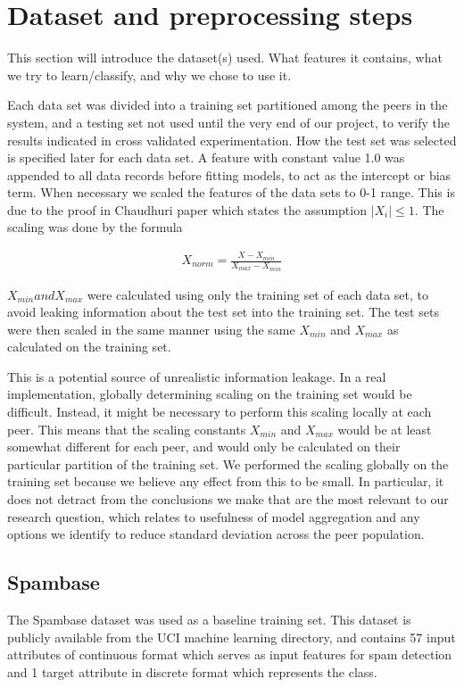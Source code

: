 \section{Dataset and preprocessing steps}
\label{sec:datasets}
This section will introduce the dataset(s) used. What features it contains, what we try to learn/classify, and why we chose to use it.

Each data set was divided into a training set partitioned among the peers in the system, and a testing set not used until the very end of our project, to verify the results indicated in cross validated experimentation. How the test set was selected is specified later for each data set.
A feature with constant value 1.0 was appended to all data records before fitting models, to act as the intercept or bias term. When necessary we scaled the features of the data sets to 0-1 range. This is due to the proof in Chaudhuri paper which states the assumption $|X_i|\leq 1$. The scaling was done by the formula

\begin{eqnarray}
X_{norm} = \frac{X-X_{min}}{X_{max} - X_{min}}
\end{eqnarray}

$X_{min} and X_{max}$ were calculated using only the training set of each data set, to avoid leaking information about the test set into the training set. The test sets were then scaled in the same manner using the same $X_{min}$ and $X_{max}$ as calculated on the training set.

This is a potential source of unrealistic information leakage. In a real implementation, globally determining scaling on the training set would be difficult. Instead, it might be necessary to perform this scaling locally at each peer. This means that the scaling constants $X_{min}$ and $X_{max}$ would be at least somewhat different for each peer, and would only be calculated on their particular partition of the training set. We performed the scaling globally on the training set because we believe any effect from this to be small. In particular, it does not detract from the conclusions we make that are the most relevant to our research question, which relates to usefulness of model aggregation and any options we identify to reduce standard deviation across the peer population.  

\subsection{Spambase} \label{sec:spambase}
The Spambase dataset \cite{spambase1999data} was used as a baseline training set. This dataset is publicly available from the UCI machine learning directory, and contains 57 input attributes of continuous format which serves as input features for spam detection and 1 target attribute in discrete format which represents the class.

